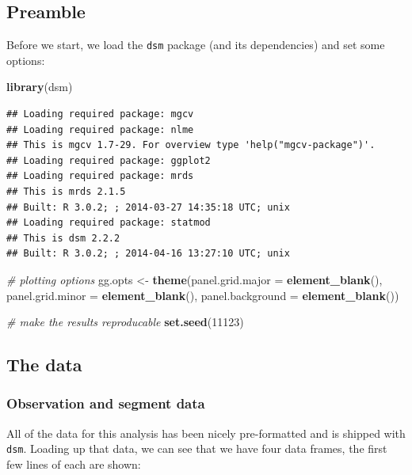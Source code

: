 \documentclass[]{article}
\newenvironment{Shaded}{}{}
\newcommand{\KeywordTok}[1]{\textcolor[rgb]{0.00,0.44,0.13}{\textbf{{#1}}}}
\newcommand{\DataTypeTok}[1]{\textcolor[rgb]{0.56,0.13,0.00}{{#1}}}
\newcommand{\DecValTok}[1]{\textcolor[rgb]{0.25,0.63,0.44}{{#1}}}
\newcommand{\StringTok}[1]{\textcolor[rgb]{0.25,0.44,0.63}{{#1}}}
\newcommand{\CommentTok}[1]{\textcolor[rgb]{0.38,0.63,0.69}{\textit{{#1}}}}
\newcommand{\NormalTok}[1]{{#1}}
\begin{document}
\subsection{Preamble}\label{preamble}

Before we start, we load the \texttt{dsm} package (and its dependencies)
and set some options:

\begin{Shaded}
\begin{Highlighting}[]
\KeywordTok{library}\NormalTok{(dsm)}
\end{Highlighting}
\end{Shaded}

\begin{verbatim}
## Loading required package: mgcv
## Loading required package: nlme
## This is mgcv 1.7-29. For overview type 'help("mgcv-package")'.
## Loading required package: ggplot2
## Loading required package: mrds
## This is mrds 2.1.5
## Built: R 3.0.2; ; 2014-03-27 14:35:18 UTC; unix
## Loading required package: statmod
## This is dsm 2.2.2
## Built: R 3.0.2; ; 2014-04-16 13:27:10 UTC; unix
\end{verbatim}

\begin{Shaded}
\begin{Highlighting}[]

\CommentTok{# plotting options}
\NormalTok{gg.opts <-}\StringTok{ }\KeywordTok{theme}\NormalTok{(}\DataTypeTok{panel.grid.major =} \KeywordTok{element_blank}\NormalTok{(), }\DataTypeTok{panel.grid.minor =} \KeywordTok{element_blank}\NormalTok{(), }
    \DataTypeTok{panel.background =} \KeywordTok{element_blank}\NormalTok{())}

\CommentTok{# make the results reproducable}
\KeywordTok{set.seed}\NormalTok{(}\DecValTok{11123}\NormalTok{)}
\end{Highlighting}
\end{Shaded}

\subsection{The data}\label{the-data}

\subsubsection{Observation and segment
data}\label{observation-and-segment-data}

All of the data for this analysis has been nicely pre-formatted and is
shipped with \texttt{dsm}. Loading up that data, we can see that we have
four data frames, the first few lines of each are shown:
\end{document}
